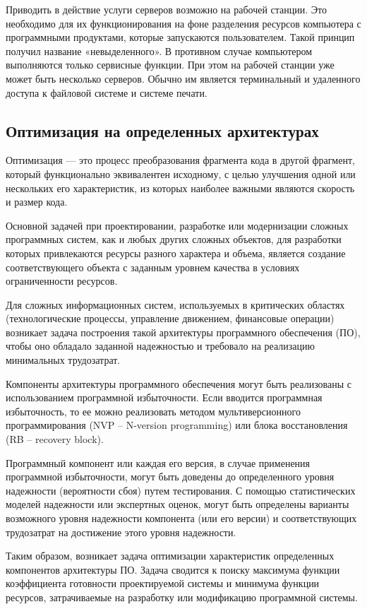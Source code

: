 \documentclass[12pt]{article}
\begin{document}
	Приводить в действие услуги серверов возможно на рабочей станции. Это необходимо для их функционирования на фоне разделения ресурсов компьютера с программными продуктами, которые запускаются пользователем. Такой принцип получил название «невыделенного». В противном случае компьютером выполняются только сервисные функции. При этом на рабочей станции уже может быть несколько серверов. Обычно им является терминальный и удаленного доступа к файловой системе и системе печати.
	
	\subsection*{Оптимизация на определенных архитектурах}
	Оптимизация --- это процесс преобразования фрагмента кода в другой фрагмент, который функционально эквивалентен исходному, с целью улучшения одной или нескольких его характеристик, из которых наиболее важными являются скорость и размер кода.
	
	Основной задачей при проектировании, разработке или модернизации сложных программных систем, как и любых других сложных объектов, для разработки которых привлекаются ресурсы разного характера и объема, является создание соответствующего объекта с заданным уровнем качества в условиях ограниченности ресурсов. 
	
	Для сложных информационных систем, используемых в критических областях (технологические процессы, управление движением, финансовые операции) возникает задача построения такой архитектуры программного обеспечения (ПО), чтобы оно обладало заданной надежностью и требовало на реализацию минимальных трудозатрат. 
	
	Компоненты архитектуры программного обеспечения могут быть реализованы с использованием программной избыточности. Если вводится программная избыточность, то ее можно реализовать методом мультиверсионного программирования (NVP – N-version programming) или блока восстановления (RB – recovery block). 
	
	Программный компонент или каждая его версия, в случае применения программной избыточности, могут быть доведены до определенного уровня надежности (вероятности сбоя) путем тестирования. С помощью статистических моделей надежности или экспертных оценок, могут быть определены варианты возможного уровня надежности компонента (или его версии) и соответствующих трудозатрат на достижение этого уровня надежности. 
	
	Таким образом, возникает задача оптимизации характеристик определенных компонентов архитектуры ПО. Задача сводится к поиску максимума функции коэффициента готовности проектируемой системы и минимума функции ресурсов, затрачиваемые на разработку или модификацию программной системы.
	
\end{document}
